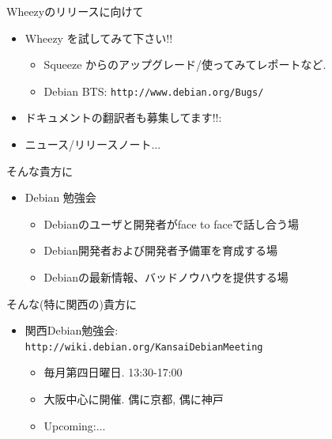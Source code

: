 \documentclass[cjk,dvipdfmx,12pt,compress,%
hyperref={bookmarks=true,bookmarksnumbered=true,bookmarksopen=false,%
  colorlinks=false,%
  pdftitle={第 66 回 関西 Debian 勉強会@KOF2012},%
  pdfauthor={佐々木洋平},%
  pdfsubject={資料},%
}]{beamer}
\begin{document}
\begin{frame}{Wheezyのリリースに向けて}

\begin{itemize}
  \item Wheezy を{\color{red}{是非}}試してみて下さい!!
  \begin{itemize}
    \item Squeeze からのアップグレード/使ってみてレポートなど.
    \item  Debian BTS: \texttt{http://www.debian.org/Bugs/}
  \end{itemize}
  \item ドキュメントの翻訳者も募集してます!!:
  \item ニュース/リリースノート...
\end{itemize}

\end{frame}


\begin{frame}{そんな貴方に}

\begin{itemize}
\item Debian 勉強会
  \begin{itemize}
  \item Debianのユーザと開発者がface to faceで話し合う場
  \item Debian開発者および開発者予備軍を育成する場
  \item Debianの最新情報、バッドノウハウを提供する場
  \end{itemize}
\end{itemize}
\end{frame}

\begin{frame}{そんな(特に関西の)貴方に}

\begin{itemize}
\item 関西Debian勉強会:\\
  \texttt{http://wiki.debian.org/KansaiDebianMeeting}
  \begin{itemize}
  \item 毎月第四日曜日. 13:30-17:00
  \item 大阪中心に開催. 偶に京都, 偶に神戸
  \item Upcoming:... \\
    \color{gray}{...もしかしたら, 11/24(土) に BSP...?}
  \end{itemize}
\end{itemize}
\end{frame}



\end{document}
